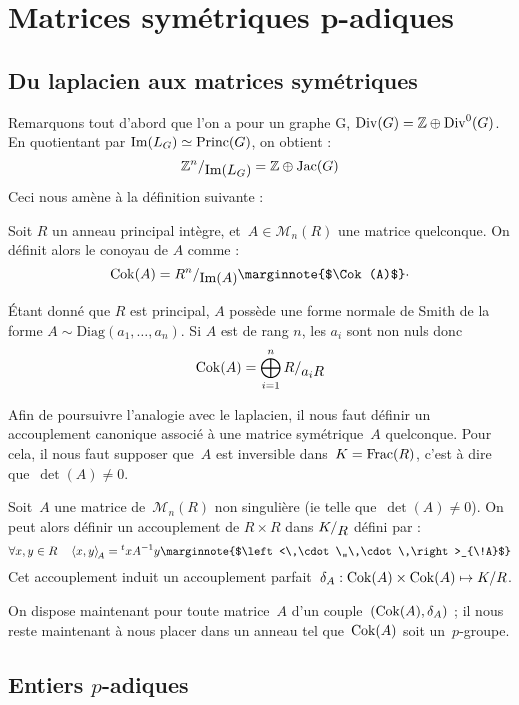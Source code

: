 \section{Matrices symétriques p-adiques}
\subsection{Du laplacien aux matrices symétriques}

Remarquons tout d'abord que l'on a pour un graphe G, $\operatorname{Div}(G) = \mathbb{Z} \oplus \operatorname{Div}^0(G)$. En quotientant par $\operatorname{Im}(L_G) \simeq \operatorname{Princ}(G)$, on obtient : 
\[ 
	\quotient{\mathbb{Z}^n}{\Im(L_G)} = \mathbb{Z} \oplus \Jac(G) 
\]
Ceci nous amène à la définition suivante : 
\begin{defi}
Soit $R$ un anneau principal intègre, et~$A\in\mathcal{M}_n(R)$ une matrice quelconque.
On définit alors le conoyau de $A$ comme : 
\[\Cok(A) = \quotient{R^n}{\Im(A)} \text{\marginnote{$\Cok(A)$}}\cdot\]
\end{defi}

\begin{rem}
\'Etant donné que $R$ est principal, $A$ possède une forme normale de Smith de la forme $A \sim \text{Diag}(a_1,\dots,a_n)$. Si $A$ est de rang $n$, les $a_i$ sont non nuls donc 
\[\Cok(A) = \bigoplus_{i=1}^n{\quotient{R}{a_iR}}\]
\end{rem}

Afin de poursuivre l'analogie avec le laplacien, il nous faut définir un accouplement canonique associé à une matrice symétrique~$A$ quelconque. Pour cela, il nous faut supposer que~$A$ est inversible dans~$K = \operatorname{Frac}(R)$, c'est à dire que~$\det(A)\neq0$.
\begin{defi}
Soit~$A$ une matrice de~$\mathcal{M}_n(R)$ non singulière (ie telle que~$\det(A)\neq 0$).
On peut alors définir un accouplement de $R\times R$ dans $\quotient{K}{R}$ défini par :
\[ \forall x,y\in R\quad \left<x,y\right>_{\!A} = {}^txA^{-1}y \text{\marginnote{$\left<\,\cdot\,,\,\cdot\,\right>_{\!A}$}}\]
Cet accouplement induit un accouplement parfait~$\delta_A : \operatorname{Cok}(A)\times\operatorname{Cok}(A) \mapsto K/R$.
\end{defi}

On dispose maintenant pour toute matrice~$A$ d'un couple~$(\operatorname{Cok}(A), \delta_A)$ ; il nous reste maintenant à nous placer dans un anneau tel que~$\operatorname{Cok}(A)$ soit un~$p$-groupe.

\subsection{Entiers $p$-adiques}


